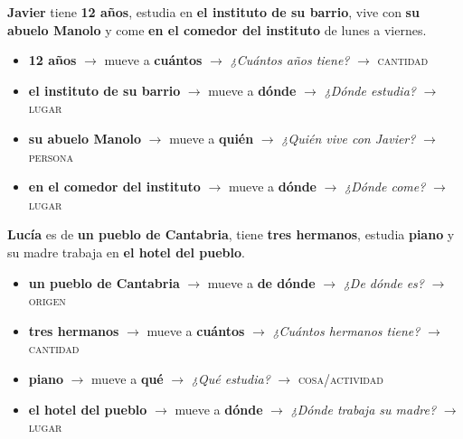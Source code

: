 \documentclass[a4paper,10pt]{article}
\begin{document}
\noindent\textbf{Javier} tiene \textcolor{morado}{\textbf{12 años}}, estudia en \textcolor{verde}{\textbf{el instituto de su barrio}}, vive con \textcolor{rojo}{\textbf{su abuelo Manolo}} y come \textcolor{verde}{\textbf{en el comedor del instituto}} de lunes a viernes.

\vspace{0.1cm}

\begin{itemize}[leftmargin=1cm, itemsep=1pt]
\item \textcolor{morado}{\textbf{12 años}} $\to$ mueve a \textbf{cuántos} $\to$ \textit{¿Cuántos años tiene?} $\to$ \textsc{cantidad}
\item \textcolor{verde}{\textbf{el instituto de su barrio}} $\to$ mueve a \textbf{dónde} $\to$ \textit{¿Dónde estudia?} $\to$ \textsc{lugar}
\item \textcolor{rojo}{\textbf{su abuelo Manolo}} $\to$ mueve a \textbf{quién} $\to$ \textit{¿Quién vive con Javier?} $\to$ \textsc{persona}
\item \textcolor{verde}{\textbf{en el comedor del instituto}} $\to$ mueve a \textbf{dónde} $\to$ \textit{¿Dónde come?} $\to$ \textsc{lugar}
\end{itemize}

\vspace{0.15cm}

\noindent\textbf{Lucía} es de \textcolor{verde}{\textbf{un pueblo de Cantabria}}, tiene \textcolor{morado}{\textbf{tres hermanos}}, estudia \textcolor{azul}{\textbf{piano}} y su madre trabaja en \textcolor{verde}{\textbf{el hotel del pueblo}}.

\vspace{0.1cm}

\begin{itemize}[leftmargin=1cm, itemsep=1pt]
\item \textcolor{verde}{\textbf{un pueblo de Cantabria}} $\to$ mueve a \textbf{de dónde} $\to$ \textit{¿De dónde es?} $\to$ \textsc{origen}
\item \textcolor{morado}{\textbf{tres hermanos}} $\to$ mueve a \textbf{cuántos} $\to$ \textit{¿Cuántos hermanos tiene?} $\to$ \textsc{cantidad}
\item \textcolor{azul}{\textbf{piano}} $\to$ mueve a \textbf{qué} $\to$ \textit{¿Qué estudia?} $\to$ \textsc{cosa/actividad}
\item \textcolor{verde}{\textbf{el hotel del pueblo}} $\to$ mueve a \textbf{dónde} $\to$ \textit{¿Dónde trabaja su madre?} $\to$ \textsc{lugar}
\end{itemize}
\end{document}
